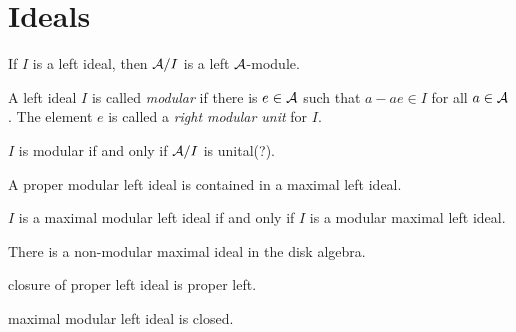 \documentclass{../../large}
\begin{document}
\section{Ideals}
\begin{prb}[Ideals]
\begin{parts}
\item If $I$ is a left ideal, then $\mathcal{A}/I$ is a left $\mathcal{A}$-module.
\end{parts}
\end{prb}

\begin{prb}
A left ideal $I$ is called \emph{modular} if there is $e\in\mathcal{A}$ such that $a-ae\in I$ for all $a\in\mathcal{A}$.
The element $e$ is called a \emph{right modular unit} for $I$.
\begin{parts}
\item $I$ is modular if and only if $\mathcal{A}/I$ is unital(?).
\item A proper modular left ideal is contained in a maximal left ideal.
\item $I$ is a maximal modular left ideal if and only if $I$ is a modular maximal left ideal.
\item There is a non-modular maximal ideal in the disk algebra.
\end{parts}
\end{prb}

\begin{prb}
\begin{parts}
\item closure of proper left ideal is proper left.
\item maximal modular left ideal is closed.
\end{parts}
\end{prb}
\end{document}
